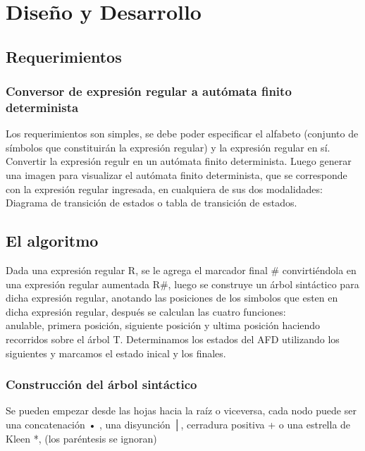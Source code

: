 \documentclass[a4paper,10pt]{article}
\begin{document}
 
\section{Diseño y Desarrollo}
\subsection{Requerimientos}
\subsubsection{Conversor de expresión regular a autómata finito determinista}
Los requerimientos son simples, se debe poder especificar el alfabeto (conjunto de símbolos que constituirán la expresión regular) y la expresión regular en sí.\\
Convertir la expresión regulr en un autómata finito determinista. Luego generar una imagen para visualizar el autómata finito determinista, que se corresponde con la expresión regular ingresada, en cualquiera de sus dos modalidades: \\
Diagrama de transición de estados o tabla de transición de estados.

\subsection{El algoritmo}
Dada una expresión regular R, se le agrega el marcador final # convirtiéndola en una expresión regular aumentada R#,
luego se construye un árbol sintáctico para dicha expresión regular, anotando las posiciones de los simbolos que esten en dicha expresión regular, después se calculan las cuatro funciones: \\
anulable, primera posición, siguiente posición y ultima posición haciendo recorridos sobre el árbol T. Determinamos los estados del AFD utilizando los siguientes y marcamos el estado inical y los finales.
\subsubsection{Construcción del árbol sintáctico}
Se pueden empezar desde las hojas hacia la raíz o viceversa, cada nodo puede ser una concatenación • , una disyunción │, cerradura positiva + o una estrella de Kleen *, 
(los paréntesis se ignoran)
\end{document}
